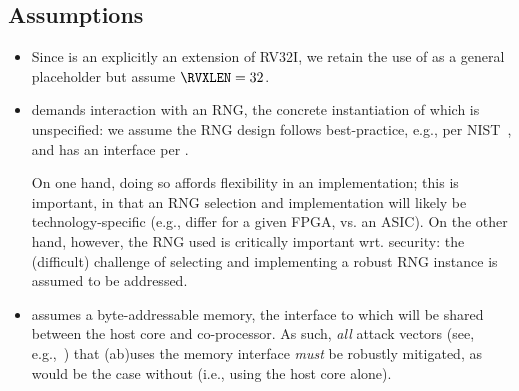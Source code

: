 
\subsection{Assumptions}
\label{sec:bg:assumption}

\begin{itemize}

\item Since \XCID is an explicitly an extension of RV32I, we retain the use
      of \RVXLEN as a general placeholder but assume $\RVXLEN = 32$.

\item \XCID demands interaction with an RNG, the concrete instantiation of 
      which is unspecified: we assume the RNG design follows best-practice,
      e.g., per NIST~\cite{SCARV:NIST:SP:800_90a,SCARV:NIST:SP:800_90b,SCARV:NIST:SP:800_90c},
      and has an interface per \cite[Section 6.4]{SCARV:NIST:SP:800_90c}.

      On one hand, doing so affords flexibility in an implementation; this 
      is important, in that an RNG selection and implementation will likely 
      be technology-specific (e.g., differ for a given FPGA, vs. an ASIC).  
      On the other hand, however, the RNG used is critically important wrt. 
      security: the (difficult) challenge of selecting and implementing 
      a robust RNG instance is assumed to be addressed.

\item \XCID assumes a byte-addressable memory, the interface to which will
      be shared between the host core and co-processor.  As such, {\em all}
      attack vectors
      (see, e.g.,~\cite{SCARV:GYCH:18})
      that (ab)uses the memory interface {\em must} be robustly mitigated, 
      as would be the case without \XCID (i.e., using the host core alone).

\end{itemize}

